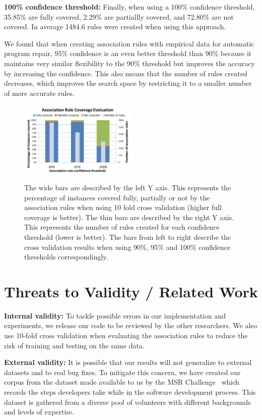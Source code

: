 \documentclass[sigconf]{acmart}
\begin{document}
\noindent\textbf{100\% confidence threshold:}
Finally, when using a 100\% confidence threshold, 35.85\% are fully
covered, 2.29\% are partiallly covered, and 72.80\% are not covered.
In average 1484.6 rules were created when using this approach.

We found that when creating association
rules with empirical data for automatic program repair, 95\% confidence
is an even better threshold than 90\% because it maintains very similar flexibility 
to the 90\% threshold but improves the accuracy by increasing the confidence. 
This also means that the number of rules created decreases, which improves
the search space by restricting it to a smaller number of more accurate rules.
 

\begin{figure}[h]
\caption{The wide bars are described by the left Y axis. This represents
the percentage of instances covered
fully, partially or not by the association rules when using 10 fold
cross validation (higher full coverage is better). 
The thin bars are described by the right Y axis.
This represents the number of rules created for each confidence threshold 
(lower is better).
The bars from left to right describe the cross validation
results when using 90\%, 95\% and 100\% confidence thresholds correspondingly.}
\centering
\includegraphics[width=0.5\textwidth]{images/assocRuleEval.png}
\label{ruleEvaluation}
\end{figure}

\section{Threats to Validity / Related Work} \label{threatsVal}

\noindent\textbf{Internal validity:}
To tackle possible errors in our implementation and experiments, we release our code
to be reviewed by the other researchers. We also use 10-fold cross validation 
when evaluating the association rules
to reduce the risk of training and testing on the same data.  

\noindent\textbf{External validity:} 
It is possible 
that our results will not generalize to external datasets and to
real bug fixes. To mitigate this concern, we have created our corpus 
from the dataset made available to us by the MSR Challenge~\cite{msr18challenge}
which records the steps developers take while in the software development process.
This dataset is gathered from a diverse pool of volunteers with different 
backgrounds and levels of expertise.
\end{document}
